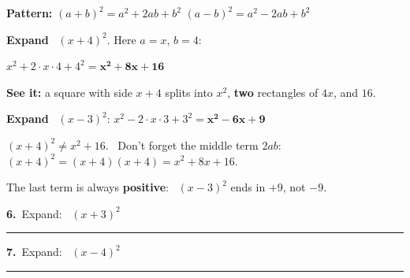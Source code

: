 \documentclass[11pt,letterpaper]{article}
\begin{document}
\begin{watchme}\begin{minipage}{0.64\linewidth}
\textbf{Pattern:} \quad $(a + b)^2 = a^2 + 2ab + b^2$ \qquad $(a - b)^2 = a^2 - 2ab + b^2$\par\vspace{2mm}
\textbf{Expand} \ $(x + 4)^2$. \quad Here $a = x$, $b = 4$:\par
\quad $x^2 + 2\cdot x\cdot 4 + 4^2 = \boldsymbol{x^2 + 8x + 16}$\par\vspace{2mm}
\textbf{See it:} a square with side $x + 4$ splits into $x^2$, \textbf{two} rectangles of $4x$, and $16$.\par\vspace{1mm}
\textbf{Expand} \ $(x - 3)^2$: \quad $x^2 - 2\cdot x\cdot 3 + 3^2 = \boldsymbol{x^2 - 6x + 9}$
\end{minipage}\hfill\begin{minipage}{0.32\linewidth}\centering {}\end{minipage}\end{watchme}
\begin{mistakebox}
$(x + 4)^2 \neq x^2 + 16$. \ Don't forget the middle term $2ab$: \ $(x + 4)^2 = (x+4)(x+4) = x^2 + 8x + 16$.\par
The last term is always \textbf{positive}: \ $(x - 3)^2$ ends in $+9$, not $-9$.
\end{mistakebox}
\needspace{2.4cm}\par\vspace{3mm}\noindent\begin{minipage}[t]{0.48\linewidth}{\color{fmturn}\bfseries 6.}\ Expand: \ $(x + 3)^2$\par\vspace{1.4cm}\hfill\rule{4.2cm}{0.4pt}\end{minipage}\hfill\begin{minipage}[t]{0.48\linewidth}{\color{fmturn}\bfseries 7.}\ Expand: \ $(x - 4)^2$\par\vspace{1.4cm}\hfill\rule{4.2cm}{0.4pt}\end{minipage}\par
\end{document}
